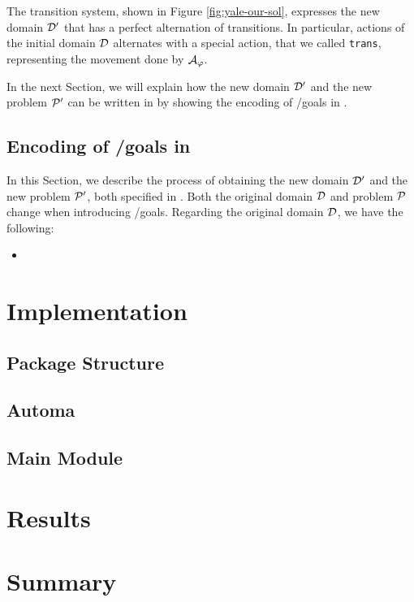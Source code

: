 The transition system, shown in Figure \ref{fig:yale-our-sol}, expresses the new domain $\D'$ that has a perfect alternation of transitions. In particular, actions of the initial domain $\D$ alternates with a special action, that we called \texttt{trans}, representing the movement done by $\automaton_\varphi$. 

In the next Section, we will explain how the new domain $\D'$ and the new problem $\P'$ can be written in \PDDL by showing the encoding of \LTLf/\PLTL goals in \PDDL.

\subsection{Encoding of \LTLf/\PLTL goals in \PDDL}
In this Section, we describe the process of obtaining the new domain $\D'$ and the new problem $\P'$, both specified in \PDDL. Both the original \PDDL domain $\D$ and problem $\P$ change when introducing \LTLf/\PLTL goals. Regarding the original domain $\D$, we have the following:
\begin{itemize}
\item 
\end{itemize}

























\section{Implementation}\label{sec:planning-implementation}
\subsection{Package Structure}
\subsection{\PDDL}
\subsection{Automa}
\subsection{Main Module}
\section{Results}
\section{Summary}
